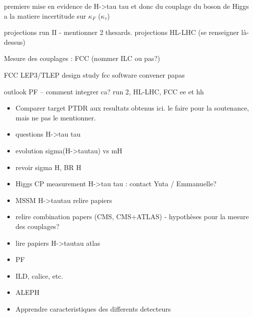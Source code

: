 premiere mise en evidence de H->tau tau et donc du couplage du boson de Higgs a la matiere
incertitude sur $\kappa_F$ ($\kappa_\tau$)

projections run II - mentionner 2 thesards. 
projections HL-LHC (se renseigner là-dessus)

Mesure des couplages : FCC (nommer ILC ou pas?) 

FCC 
LEP3/TLEP 
design study 
fcc software convener
papas 

outlook PF -- comment integrer ca? 
run 2, HL-LHC, FCC ee et hh 

\begin{itemize}
\item Comparer target PTDR aux resultats obtenus ici. le faire pour la soutenance, mais ne pas le mentionner. 
\item questions H->tau tau 
\item evolution sigma(H->tautau) vs mH
\item revoir sigma H, BR H
\item  Higgs CP measurement H->tau tau : contact Yuta / Emmanuelle? 
\item   MSSM H->tautau relire papiers
\item   relire combination papers (CMS, CMS+ATLAS) - hypothèses pour la mesure des couplages? 
\item   lire papiers H->tautau atlas
\item PF 
\item   ILD, calice, etc.
\item  ALEPH 
\item   Apprendre caracteristiques des differents detecteurs
\end{itemize}
